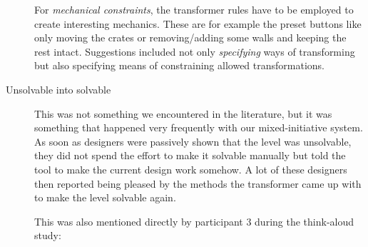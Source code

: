 \begin{description}
For \textit{mechanical constraints}, the transformer rules have to be employed to create interesting mechanics. These are for example the preset buttons like only moving the crates or removing/adding some walls and keeping the rest intact. Suggestions included not only \textit{specifying} ways of transforming but also specifying means of constraining allowed transformations. 

\item[Unsolvable into solvable] This was not something we encountered in the literature, but it was something that happened very frequently with our mixed-initiative system. As soon as designers were passively shown that the level was unsolvable, they did not spend the effort to make it solvable manually but told the tool to make the current design work somehow. A lot of these designers then reported being pleased by the methods the transformer came up with to make the level solvable again.

This was also mentioned directly by participant 3 during the think-aloud study: \textit{}


\end{description}
